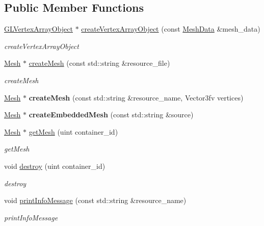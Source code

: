 \subsection*{Public Member Functions}
\begin{DoxyCompactItemize}
\item 
\hyperlink{classEngine_1_1GLVertexArrayObject}{G\+L\+Vertex\+Array\+Object} $\ast$ \hyperlink{classEngine_1_1MeshManager_a966a158ba75b202a073992c9a9e27fd0}{create\+Vertex\+Array\+Object} (const \hyperlink{classEngine_1_1MeshData}{Mesh\+Data} \&mesh\+\_\+data)
\begin{DoxyCompactList}\small\item\em create\+Vertex\+Array\+Object \end{DoxyCompactList}\item 
\hyperlink{classEngine_1_1Mesh}{Mesh} $\ast$ \hyperlink{classEngine_1_1MeshManager_a2a5c7a63ef5ecbbb3c754063a7ebc864}{create\+Mesh} (const std\+::string \&resource\+\_\+file)
\begin{DoxyCompactList}\small\item\em create\+Mesh \end{DoxyCompactList}\item 
\hypertarget{classEngine_1_1MeshManager_a05e3a4f93f6a01ced5d5e734ca698e78}{}\hyperlink{classEngine_1_1Mesh}{Mesh} $\ast$ {\bfseries create\+Mesh} (const std\+::string \&resource\+\_\+name, Vector3fv vertices)\label{classEngine_1_1MeshManager_a05e3a4f93f6a01ced5d5e734ca698e78}

\item 
\hypertarget{classEngine_1_1MeshManager_ac030e6b00ec5839d6b7cf01f897078e2}{}\hyperlink{classEngine_1_1Mesh}{Mesh} $\ast$ {\bfseries create\+Embedded\+Mesh} (const std\+::string \&source)\label{classEngine_1_1MeshManager_ac030e6b00ec5839d6b7cf01f897078e2}

\item 
\hyperlink{classEngine_1_1Mesh}{Mesh} $\ast$ \hyperlink{classEngine_1_1MeshManager_a0b273525c26e672a12c660a500f6d776}{get\+Mesh} (uint container\+\_\+id)
\begin{DoxyCompactList}\small\item\em get\+Mesh \end{DoxyCompactList}\item 
void \hyperlink{classEngine_1_1MeshManager_a42a66b67e3123ed190edbd5be5fac412}{destroy} (uint container\+\_\+id)
\begin{DoxyCompactList}\small\item\em destroy \end{DoxyCompactList}\item 
void \hyperlink{classEngine_1_1MeshManager_af9a57216dac74b11f0531058612a1954}{print\+Info\+Message} (const std\+::string \&resource\+\_\+name)
\begin{DoxyCompactList}\small\item\em print\+Info\+Message \end{DoxyCompactList}\end{DoxyCompactItemize}


